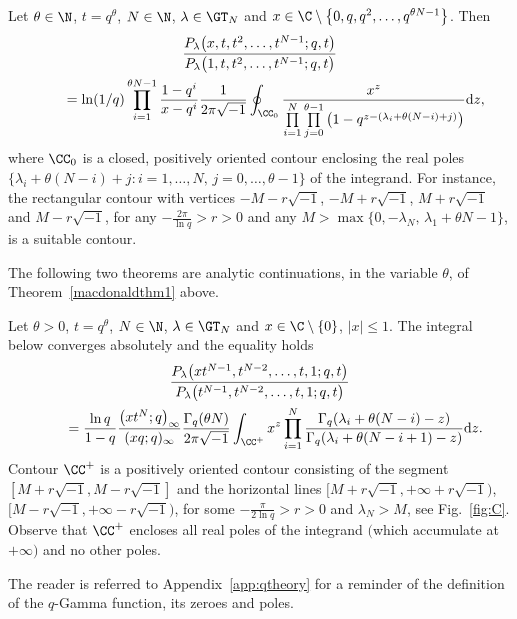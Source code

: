 \begin{thm}\label{macdonaldthm1}
Let $\theta\in\N$, $t = q^{\theta}$, $N\in\N$, $\lambda\in\GT_N$ and $x\in\C \setminus \big\{0, q, q^2, \dots, q^{\theta N - 1}\big\}$. Then
\begin{gather}
\frac{P_{\lambda}\big(x, t, t^2, \dots, t^{N-1}; q, t\big)}{P_{\lambda}\big(1, t, t^2, \dots, t^{N-1}; q, t\big)} \nonumber\\
\qquad {} = \ln(1/q)\prod_{i=1}^{\theta N - 1}{\frac{1 - q^i}{x - q^i}}\frac{1}{2\pi\sqrt{-1}}\oint_{\CC_0}{\frac{x^z}{\prod\limits_{i=1}^N\prod\limits_{j=0}^{\theta -1}{\big(1 - q^{z - (\lambda_i + \theta(N-i) + j)}\big)}}{\rm d}z},\label{macdonaldthm1eqn}
\end{gather}
where $\CC_0$ is a closed, positively oriented contour enclosing the real poles $\{\lambda_i + \theta(N-i) + j \colon i = 1, \dots, N, \, j = 0, \dots, \theta - 1\}$ of the integrand. For instance, the rectangular contour with vertices $-M-r\sqrt{-1}$, $ -M+r\sqrt{-1}$, $M+r\sqrt{-1}$ and $M-r\sqrt{-1}$, for any $-\frac{2\pi}{\ln{q}} > r > 0$ and any $M > \max\{0, -\lambda_N, \, \lambda_1 + \theta N - 1\}$, is a suitable contour.
\end{thm}

The following two theorems are analytic continuations, in the variable $\theta$, of Theorem~\ref{macdonaldthm1} above.

\begin{thm}\label{macdonaldthm2}
Let $\theta > 0$, $t = q^{\theta}$, $N\in\N$, $\lambda\in\GT_N$ and $x\in\C \setminus \{0\}$, $|x|\leq 1$. The integral below converges absolutely and the equality holds
\begin{gather}
\frac{P_{\lambda}\big(xt^{N-1}, t^{N-2}, \dots, t, 1; q, t\big)}{P_{\lambda}\big(t^{N-1}, t^{N-2}, \dots, t, 1; q, t\big)}\nonumber\\
 \qquad{} = \frac{\ln q}{1 - q}\frac{\big(xt^N; q\big)_{\infty}}{(xq; q)_{\infty}}\frac{\Gamma_q(\theta N)}{2\pi\sqrt{-1}}\int_{\CC^+}{x^z\prod_{i=1}^N{\frac{\Gamma_q(\lambda_i + \theta(N-i)-z)}{\Gamma_q(\lambda_i + \theta(N-i+1)-z)}}{\rm d}z}.\label{macdonaldthm2eqn}
\end{gather}
Contour $\CC^+$ is a positively oriented contour consisting of the segment $[M+r\sqrt{-1}, M-r\sqrt{-1}]$ and the horizontal lines $[M+r\sqrt{-1}, +\infty+r\sqrt{-1})$, $[M-r\sqrt{-1}, +\infty-r\sqrt{-1})$, for some $-\frac{\pi}{2\ln{q}} > r > 0$ and $\lambda_N > M$, see Fig.~{\rm \ref{fig:C}}. Observe that $\CC^+$ encloses all real poles of the integrand $($which accumulate at~$+\infty)$ and no other poles.
\end{thm}

The reader is referred to Appendix~\ref{app:qtheory} for a reminder of the def\/inition of the $q$-Gamma function, its zeroes and poles.
